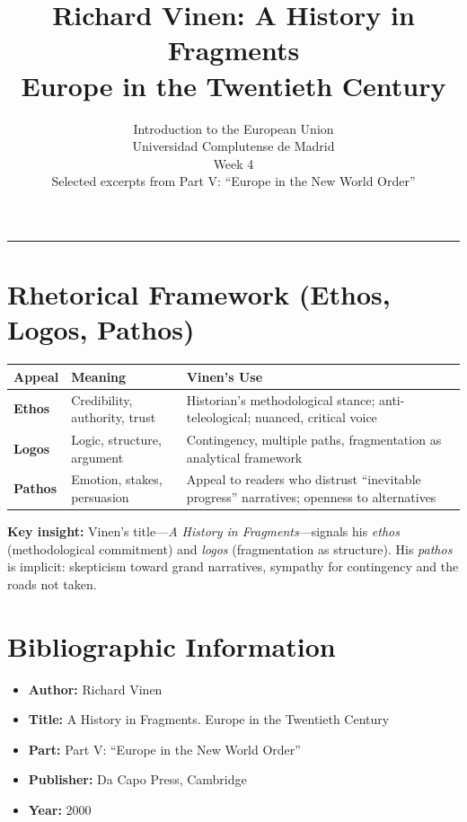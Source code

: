 \documentclass[11pt,a4paper]{article}
\begin{document}
\title{Richard Vinen: A History in Fragments\\Europe in the Twentieth Century}
\author{Introduction to the European Union\\Universidad Complutense de Madrid\\Week 4\\Selected excerpts from Part V: ``Europe in the New World Order''}
\date{}
\maketitle
\vspace{-1em}
\hrule
\vspace{1em}

\section*{Rhetorical Framework (Ethos, Logos, Pathos)}

\begin{table}[h]
\centering
\begin{tabular}{@{}lll@{}}
\toprule
\textbf{Appeal} & \textbf{Meaning} & \textbf{Vinen's Use} \\
\midrule
\textbf{Ethos} & Credibility, authority, trust & Historian's methodological stance; anti-teleological; nuanced, critical voice \\
\textbf{Logos} & Logic, structure, argument & Contingency, multiple paths, fragmentation as analytical framework \\
\textbf{Pathos} & Emotion, stakes, persuasion & Appeal to readers who distrust ``inevitable progress'' narratives; openness to alternatives \\
\bottomrule
\end{tabular}
\end{table}

\textbf{Key insight:} Vinen's title---\textit{A History in Fragments}---signals his \textit{ethos} (methodological commitment) and \textit{logos} (fragmentation as structure). His \textit{pathos} is implicit: skepticism toward grand narratives, sympathy for contingency and the roads not taken.

\section*{Bibliographic Information}

\begin{itemize}
\item \textbf{Author:} Richard Vinen
\item \textbf{Title:} A History in Fragments. Europe in the Twentieth Century
\item \textbf{Part:} Part V: ``Europe in the New World Order''
\item \textbf{Publisher:} Da Capo Press, Cambridge
\item \textbf{Year:} 2000
\end{itemize}
\end{document}
